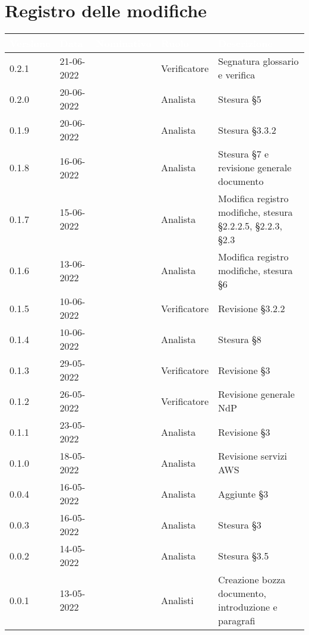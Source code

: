 \section*{Registro delle modifiche}
{

\newlength{\freewidth}
\setlength{\freewidth}{\dimexpr\textwidth-10\tabcolsep}
\renewcommand{\arraystretch}{1.5}
\centering
\setlength{\aboverulesep}{0pt}
\setlength{\belowrulesep}{0pt}
\begin{longtable}{C{.13\freewidth} C{.15\freewidth} C{.26\freewidth} C{.18\freewidth} C{.282379\freewidth}}
	\toprule
{}
\textcolor{white}{\textbf{Versione}}&
\textcolor{white}{\textbf{Data}}&
\textcolor{white}{\textbf{Nominativo}}&
\textcolor{white}{\textbf{Ruolo}}&
\textcolor{white}{\textbf{Descrizione}}\\	
\toprule
\endhead

0.2.1 & 21-06-2022 & \marcob{} & Verificatore & Segnatura glossario e verifica \\
0.2.0 & 20-06-2022 & \marcob{} & Analista & Stesura \S 5 \\
0.1.9 & 20-06-2022 & \giulio{} & Analista & Stesura \S 3.3.2 \\
0.1.8 & 16-06-2022 & \matteo{} & Analista & Stesura \S 7 e revisione generale documento \\
0.1.7 & 15-06-2022 & \giulio{} & Analista & Modifica registro modifiche, stesura \S 2.2.2.5, \S 2.2.3, \S 2.3 \\
0.1.6 & 13-06-2022 & \marcob{} & Analista & Modifica registro modifiche, stesura \S 6 \\
0.1.5 & 10-06-2022 & \marcov{} & Verificatore & Revisione \S 3.2.2 \\
0.1.4 & 10-06-2022 & \matteo{} & Analista & Stesura \S 8\\
0.1.3 & 29-05-2022 & \matteo{} & Verificatore & Revisione \S 3\\
0.1.2 & 26-05-2022 & \marcov{} & Verificatore & Revisione generale NdP\\
0.1.1 & 23-05-2022 & \matteo{} & Analista & Revisione \S 3 \\
0.1.0 & 18-05-2022 & \marcov{} & Analista & Revisione servizi AWS\\
0.0.4 & 16-05-2022 & \matteo{} & Analista & Aggiunte \S 3\\
0.0.3 & 16-05-2022 & \marcov{} & Analista & Stesura \S 3 \\		
0.0.2 & 14-05-2022 & \matteo{} & Analista & Stesura \S 3.5\\
0.0.1 & 13-05-2022 & \teamname{} & Analisti & Creazione bozza documento, introduzione e paragrafi\\	
\bottomrule
\end{longtable}
}
